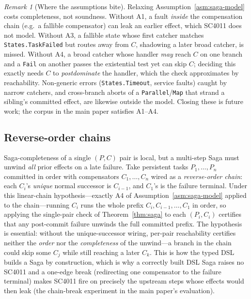 \documentclass[11pt]{article}
\newcommand{\code}[1]{\textsf{\small #1}}
\theoremstyle{plain}
\theoremstyle{definition}
\theoremstyle{remark}
\newtheorem{remark}{Remark}
\begin{document}
\begin{remark}[Where the assumptions bite]\label{rmk:saga-limits}
Relaxing Assumption~\ref{asm:saga-model} costs completeness, not soundness. Without A1, a fault
\emph{inside} the compensation chain (e.g.\ a fallible compensator) can leak an earlier effect,
which \code{SC4011} does not model. Without A3, a fallible state whose first catcher matches
\texttt{States.TaskFailed} but routes away from $C$, shadowing a later broad catcher, is missed.
Without A4, a broad catcher whose handler \emph{may} reach $C$ on one branch and a \texttt{Fail}
on another passes the existential test yet can skip $C$; deciding this exactly needs $C$ to
\emph{postdominate} the handler, which the check approximates by reachability. Non-generic errors
(\texttt{States.Timeout}, service faults) caught by narrow catchers, and cross-branch aborts of a
\texttt{Parallel}/\texttt{Map} that strand a sibling's committed effect, are likewise outside the
model. Closing these is future work; the corpus in the main paper satisfies A1--A4.
\end{remark}

\subsection{Reverse-order chains}

Saga-completeness of a single $(P,C)$ pair is local, but a multi-step Saga must unwind \emph{all}
prior effects on a late failure. Take persistent tasks $P_1,\dots,P_n$ committed in order with
compensators $C_1,\dots,C_n$ wired as a \emph{reverse-order chain}: each $C_i$'s \emph{unique}
normal successor is $C_{i-1}$, and $C_1$'s is the failure terminal. Under this linear-chain
hypothesis---exactly A4 of Assumption~\ref{asm:saga-model} applied to the chain---running $C_i$
runs the whole prefix $C_i,C_{i-1},\dots,C_1$ in order, so applying the single-pair check of
Theorem~\ref{thm:saga} to each $(P_i,C_i)$ certifies that any post-commit failure unwinds the
full committed prefix. The hypothesis is essential: without the unique-successor wiring, per-pair
reachability certifies neither the \emph{order} nor the \emph{completeness} of the unwind---a
branch in the chain could skip some $C_j$ while still reaching a later $C_k$. This is how the
typed DSL builds a Saga by construction, which is why a correctly built DSL Saga raises no
\code{SC4011} and a one-edge break (redirecting one compensator to the failure terminal) makes
\code{SC4011} fire on precisely the upstream steps whose effects would then leak (the chain-break
experiment in the main paper's evaluation).
\end{document}
